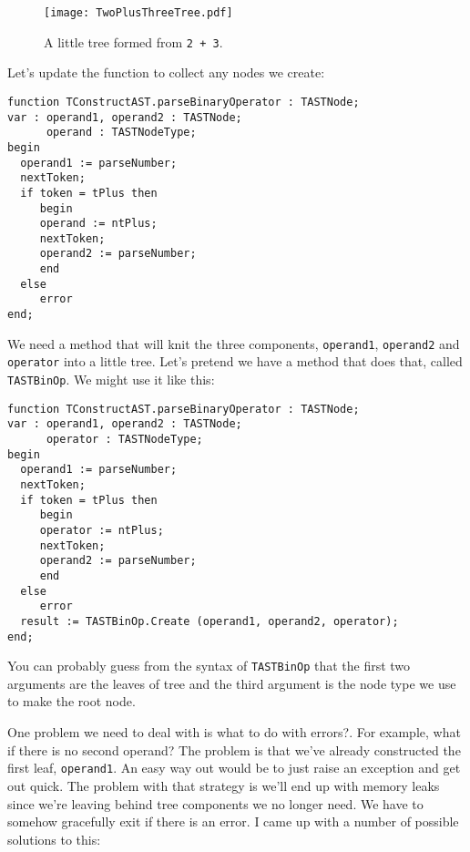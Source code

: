 \begin{figure}[htpb]
\centering
\texttt{[image: TwoPlusThreeTree.pdf]}
\caption{A little tree formed from {\tt 2 + 3}.}
\label{fig:TwoPlusThreeTree}
\end{figure}

Let's update the function to collect any nodes we create:

\begin{lstlisting}
function TConstructAST.parseBinaryOperator : TASTNode;
var : operand1, operand2 : TASTNode;
      operand : TASTNodeType;
begin
  operand1 := parseNumber;
  nextToken;
  if token = tPlus then
     begin
     operand := ntPlus;
     nextToken;
     operand2 := parseNumber;
     end
  else
     error
end;
\end{lstlisting}

We need a method that will knit the three components, {\tt operand1}, {\tt operand2} and {\tt operator} into a little tree. Let's pretend we have a method that does that, called {\tt TASTBinOp}. We might use it like this:

\begin{lstlisting}
function TConstructAST.parseBinaryOperator : TASTNode;
var : operand1, operand2 : TASTNode;
      operator : TASTNodeType;
begin
  operand1 := parseNumber;
  nextToken;
  if token = tPlus then
     begin
     operator := ntPlus;
     nextToken;
     operand2 := parseNumber;
     end
  else
     error
  result := TASTBinOp.Create (operand1, operand2, operator);
end;
\end{lstlisting}

You can probably guess from the syntax of {\tt TASTBinOp} that the first two arguments are the leaves of tree and the third argument is the node type we use to make the root node.

One problem we need to deal with is what to do with errors?. For example, what if there is no second operand? The problem is that we've already constructed the first leaf, {\tt operand1}. An easy way out would be to just raise an exception and get out quick. The problem with that strategy is we'll end up with memory leaks since we're leaving behind tree components we no longer need. We have to somehow gracefully exit if there is an error. I came up with a number of possible solutions to this:

